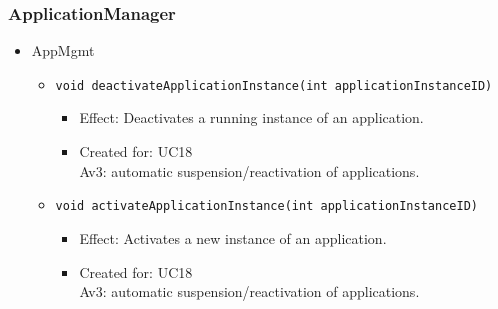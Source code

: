     \subsubsection{ApplicationManager}
        \begin{itemize}
            \item AppMgmt
            \begin{itemize}
                \item \texttt{void deactivateApplicationInstance(int applicationInstanceID)}
                \begin{itemize}
                    \item Effect: Deactivates a running instance of an application.
                    \item Created for: UC18 \\
                          Av3: automatic suspension/reactivation of applications.
                \end{itemize}
                \item \texttt{void activateApplicationInstance(int applicationInstanceID)}
                \begin{itemize}
                    \item Effect: Activates a new instance of an application.
                    \item Created for: UC18 \\
                          Av3: automatic suspension/reactivation of applications.
                \end{itemize}
            \end{itemize}
        \end{itemize}

